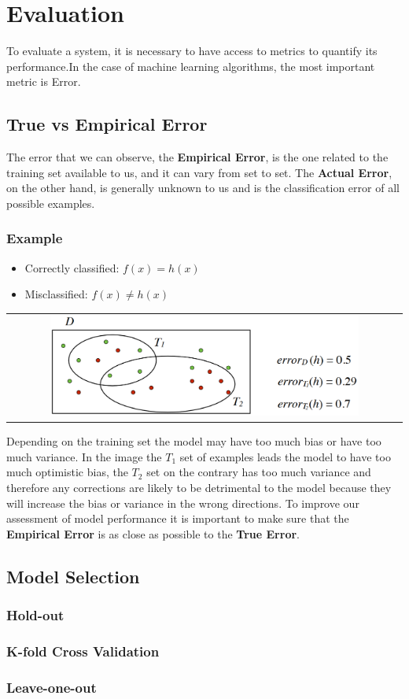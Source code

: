 \section{Evaluation}

To evaluate a system, it is necessary to have access to metrics to quantify its performance.In the case of machine learning algorithms, the most important metric is Error.

\subsection{True vs Empirical Error}
The error that we can observe, the \textbf{Empirical Error}, is the one related to the training set available to us, and it can vary from set to set. The \textbf{Actual Error}, on the other hand, is generally unknown to us and is the classification error of all possible examples.

\subsubsection{Example}
\begin{itemize}
    \item[\textcolor{green!50!black}{\textbullet}] Correctly classified: $f(x) = h(x)$
    \item[\textcolor{red}{\textbullet}] Misclassified: $f(x) \not= h(x)$
\end{itemize}
\begin{center}
    \begin{tabular}{c}
        \includegraphics[width=0.8\textwidth]{images/Error.png}
    \end{tabular}
\end{center}
Depending on the training set the model may have too much bias or have too much variance.  In the image the $T_1$ set of examples leads the model to have too much optimistic bias, the $T_2$ set on the contrary has too much variance and therefore any corrections are likely to be detrimental to the model because they will increase the bias or variance in the wrong directions.  To improve our assessment of model performance it is important to make sure that the \textbf{Empirical Error} is as close as possible to the \textbf{True Error}.

\subsection{Model Selection}

\subsubsection{Hold-out}

\subsubsection{K-fold Cross Validation}

\subsubsection{Leave-one-out}


\newpage